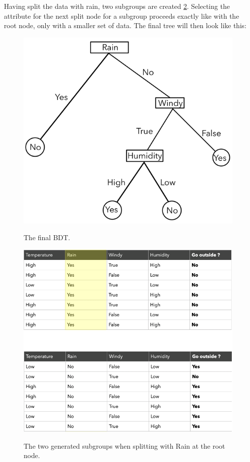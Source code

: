 \documentclass[
12pt,
headsepline,
bibliography=totoc,
twoside=semi,
fleqn
]{scrartcl}
\begin{document}
 Having split the data with rain, two subgroups are created \ref{fig:fig10}. Selecting the attribute for the next split node for a subgroup proceeds exactly like with the root node, only with a smaller set of data. The final tree will then look like this: 

 \begin{figure}[H]
 \centering\includegraphics[scale=0.7]{BDT11.png}\label{fig:fig11}
 \caption{The final BDT.}
 \end{figure}
 

 \begin{figure}[H]
 \centering\includegraphics[scale=0.7]{BDT10.png}\label{fig:fig10}
 \caption{The two generated subgroups when splitting with Rain at the root node.}
 \end{figure}
 
\end{document}
